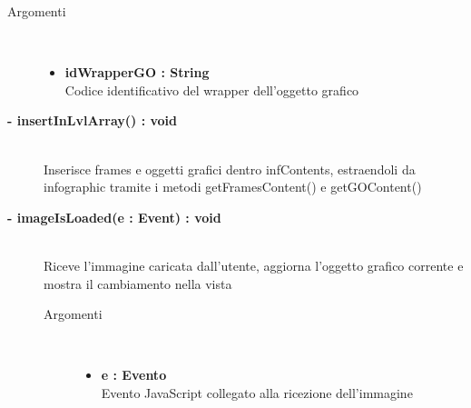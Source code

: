 \begin{description}
\begin{description}
		\begin{description}
			\item[Argomenti] \hfill \\
				\begin{itemize}
				
					\item \textbf{idWrapperGO : String		} \hfill \\
					Codice identificativo del wrapper dell'oggetto grafico
					
				\end{itemize}
			
		\end{description}
	\end{description}
	
	\begin{description}
		\item[\textbf{\color{blue}- insertInLvlArray() : void		}] \hfill \\
			Inserisce frames e oggetti grafici dentro infContents, estraendoli da infographic tramite i metodi getFramesContent() e getGOContent()
			
	\end{description}
	
	\begin{description}
		\item[\textbf{\color{blue}- imageIsLoaded(e : Event) : void		}] \hfill \\
			Riceve l'immagine caricata dall'utente, aggiorna l'oggetto grafico corrente e mostra il cambiamento nella vista
			
		\begin{description}
			\item[Argomenti] \hfill \\
				\begin{itemize}
				
					\item \textbf{e :  Evento		} \hfill \\
					Evento JavaScript collegato alla ricezione dell'immagine
					
				\end{itemize}
			
		\end{description}
	\end{description}
	

\end{description}
